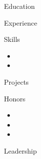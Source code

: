 \documentclass[10pt]{article}
\begin{document}

\maketitle

\begin{section}{Education}
    \berkeley{}
\end{section}

\begin{section}{Experience}
    \nerfstudio{}
    \leapxr{}
    \bosch{}
\end{section}

\begin{section}{Skills}
    \begin{itemize}
        \item\langs{}
        \item\tech{}
    \end{itemize}
\end{section}

\begin{section}{Projects}
    \studreltracker{}
    \bedouchnet{}
    \byow{}
\end{section}

\begin{section}{Honors}
   \begin{itemize}
        \item\hkninduction{}
        \item\deanslist{}
        \item\caalead{}
   \end{itemize} 
\end{section}

\begin{section}{Leadership}
    \studrel{}
\end{section}
\end{document}
